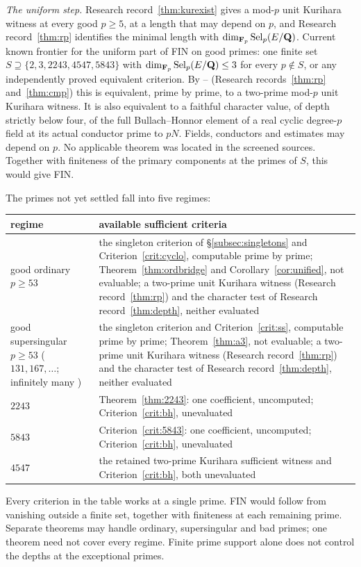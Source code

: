 \emph{The uniform step.} Research record~\ref{thm:kurexist} gives a mod-$p$ unit Kurihara witness at every good $p\ge5$, at a length that may depend on $p$, and Research record~\ref{thm:rp} identifies the minimal length with $\dim_{\mathbf{F}_p}\operatorname{Sel}_p(E/\mathbf{Q})$. Current known frontier for the uniform part of FIN on good primes: one finite set $S\supseteq\{2,3,2243,4547,5843\}$ with $\dim_{\mathbf{F}_p}\operatorname{Sel}_p(E/\mathbf{Q})\le3$ for every $p\notin S$, or any independently proved equivalent criterion. By -- (Research records~\ref{thm:rp} and~\ref{thm:cmp}) this is equivalent, prime by prime, to a two-prime mod-$p$ unit Kurihara witness. It is also equivalent to a faithful character value, of depth strictly below four, of the full Bullach--Honnor element of a real cyclic degree-$p$ field at its actual conductor prime to $pN$. Fields, conductors and estimates may depend on $p$. No applicable theorem was located in the screened sources. Together with finiteness of the primary components at the primes of $S$, this would give FIN.

The primes not yet settled fall into five regimes:

\begin{center}
\begin{tabular}{@{}p{}p{}@{}}
\toprule
regime & available sufficient criteria\\ \midrule
good ordinary $p\ge53$ & the singleton criterion of \S\ref{subsec:singletons} and Criterion~\ref{crit:cyclo}, computable prime by prime; Theorem~\ref{thm:ordbridge} and Corollary~\ref{cor:unified}, not evaluable; a two-prime unit Kurihara witness (Research record~\ref{thm:rp}) and the character test of Research record~\ref{thm:depth}, neither evaluated\\
good supersingular $p\ge53$ ($131,167,\dots$; infinitely many \cite{elkies}) & the singleton criterion and Criterion~\ref{crit:ss}, computable prime by prime; Theorem~\ref{thm:a3}, not evaluable; a two-prime unit Kurihara witness (Research record~\ref{thm:rp}) and the character test of Research record~\ref{thm:depth}, neither evaluated\\
$2243$ & Theorem~\ref{thm:2243}: one coefficient, uncomputed; Criterion~\ref{crit:bh}, unevaluated\\
$5843$ & Criterion~\ref{crit:5843}: one coefficient, uncomputed; Criterion~\ref{crit:bh}, unevaluated\\
$4547$ & the retained two-prime Kurihara sufficient witness and Criterion~\ref{crit:bh}, both unevaluated\\ \bottomrule
\end{tabular}
\end{center}
Every criterion in the table works at a single prime. FIN would follow from vanishing outside a finite set, together with finiteness at each remaining prime. Separate theorems may handle ordinary, supersingular and bad primes; one theorem need not cover every regime. Finite prime support alone does not control the depths at the exceptional primes.

